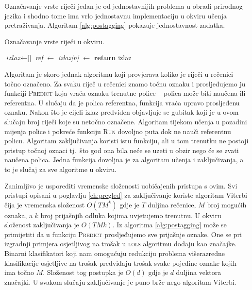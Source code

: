 Označavanje vrste riječi jedan je od jednostavnijih problema u obradi prirodnog
jezika i shodno tome ima vrlo jednostavnu implementaciju u okviru učenja
pretraživanja. Algoritam \ref{alg:postagging} pokazuje jednostavnost zadatka.

\begin{algorithm}
\caption{Označavanje vrste riječi u \lts{} okviru.}\label{alg:postagging}
\begin{algorithmic}[1]
\State $\textit{izlaz} \gets \text{[]}$
  \State \textit{ref} $\gets$ 
  \State \textit{izlaz[n]} $\gets$ 
\EndFor
\State {}
\State \textbf{return} izlaz
\EndFunction
\end{algorithmic}
\end{algorithm}

Algoritam je skoro jednak algoritmu koji provjerava koliko je riječi u rečenici
točno označeno. Za svaku riječ u rečenici znamo točnu oznaku i prosljeđujemo ju
funkciji \textsc{Predict} koja vraća oznaku trenutne police -- polica može biti
naučena ili referentna. U slučaju da je polica referentna, funkcija vraća upravo
prosljeđenu oznaku. Nakon što je cijeli izlaz predviđen objavljuje se gubitak
koji je u ovom slučaju broj riječi koje su netočno označene. Algoritam tijekom
učenja u pozadini mijenja police i pokreće funkciju \textsc{Run} dovoljno puta
dok ne nauči referentnu policu. Algoritam zaključivanja koristi istu funkciju,
ali u tom trenutku ne postoji pristup točnoj oznaci tj.~što god ona bila neće se
uzeti u obzir nego će se zvati naučena polica. Jedna funkcija dovoljna je za
algoritam učenja i zaključivanja, a to je slučaj za sve algoritme u \lts{}
okviru.

Zanimljivo je usporediti vremenske složenosti uobičajenih pristupa s ovim. Svi
pristupi opisani u poglavlju \ref{ch:pregled} za zaključivanje koriste algoritam
Viterbi čija je vremenska složenost $O(T M ^ k)$ gdje je $T$ duljina rečenice,
$M$ broj mogućih oznaka, a $k$ broj prijašnjih odluka kojima uvjetujemo
trenutnu. U \lts{} okviru složenost zaključivanja je $O(T M k)$. Iz
algoritma \ref{alg:postagging} može se primijetiti da u funkciju
\textsc{Predict} prosljeđujemo  sve prijašnje oznake. One se pri izgradnji
primjera osjetljivog na trošak u \textsc{lols} algoritmu dodaju kao značajke.
Binarni klasifikatori koji nam omogućuju redukciju problema višerazredne
klasifikacije osjetljive na trošak predviđaju trošak svake pojedine oznake kojih
ima točno $M$. Složenost tog postupka je $O(d)$ gdje je $d$ duljina vektora
značajki. U svakom slučaju zaključivanje je puno brže nego algoritam Viterbi.

